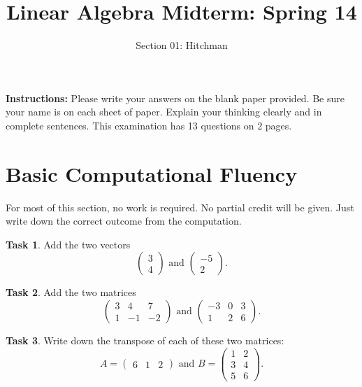 \documentclass[11pt]{amsart}
\theoremstyle{definition}
\newtheorem{task}{Task}
\begin{document}
\title{Linear Algebra Midterm: Spring 14}
\author{Section 01: Hitchman}
\date{}

\maketitle

\noindent
\textbf{Instructions:} Please write your answers on the blank paper provided.
Be sure your name is on each sheet of paper.
Explain your thinking clearly and in complete sentences.
This examination has 13 questions on 2 pages.

\section{Basic Computational Fluency}

For most of this section, no work is required. No partial credit will be given. Just write down the correct outcome from the computation.



\begin{task} Add the two vectors
\begin{equation*}
\begin{pmatrix} 3 \\ 4 \end{pmatrix} \text{ and }
\begin{pmatrix} -5 \\ 2 \end{pmatrix}.
\end{equation*}
\end{task}

\begin{task} Add the two matrices
\begin{equation*}
\begin{pmatrix} 3 & 4 & 7 \\ 1 & -1 & -2 \end{pmatrix} \text{ and }
\begin{pmatrix} -3 & 0 & 3 \\ 1 & 2 & 6 \end{pmatrix}.
\end{equation*}
\end{task}

\begin{task} Write down the transpose of each of these two matrices:
\begin{equation*}
A = \begin{pmatrix} 6 & 1 & 2 \end{pmatrix} \text{ and }
B = \begin{pmatrix} 1 & 2 \\ 3 & 4 \\ 5 & 6 \end{pmatrix}.
\end{equation*}
\end{task}
\end{document}
